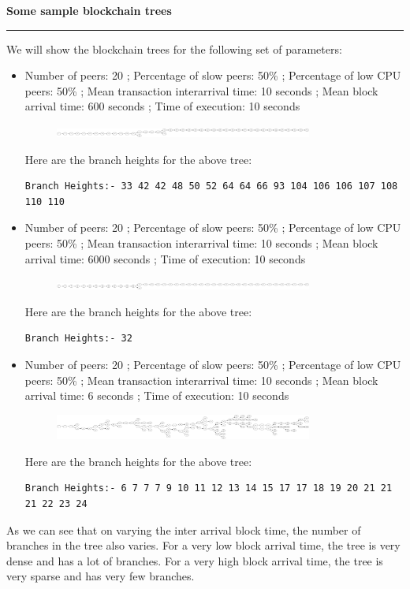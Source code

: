 \documentclass[a4paper,12pt]{article}
\newenvironment{solution}[2][]{%
\begin{mdframed}[linecolor=blue!70!black, linewidth=2pt, roundcorner=10pt, backgroundcolor=yellow!10!white, skipabove=12pt, skipbelow=12pt]%
	\textbf{\large #2}
	\par\noindent\rule{\textwidth}{0.4pt}
}{
\end{mdframed}
}
\begin{document}
\begin{solution}{Some sample blockchain trees}
	We will show the blockchain trees for the following set of parameters:

	\begin{itemize}
		\item Number of peers: 20 ; Percentage of slow peers: 50\% ; Percentage of low CPU peers: 50\% ; Mean transaction interarrival time: 10 seconds ; Mean block arrival time: 600 seconds ; Time of execution: 10 seconds
		\begin{figure}[H]
			\centering
			\includegraphics[width=0.8\textwidth]{../images/b1.png}
		\end{figure}
		Here are the branch heights for the above tree:
		\begin{verbatim}
Branch Heights:- 33 42 42 48 50 52 64 64 66 93 104 106 106 107 108 110 110
		\end{verbatim}
		\item Number of peers: 20 ; Percentage of slow peers: 50\% ; Percentage of low CPU peers: 50\% ; Mean transaction interarrival time: 10 seconds ; Mean block arrival time: 6000 seconds ; Time of execution: 10 seconds
		\begin{figure}[H]
			\centering
			\includegraphics[width=0.8\textwidth]{../images/b2.png}
		\end{figure}
		Here are the branch heights for the above tree:
		\begin{verbatim}
Branch Heights:- 32
		\end{verbatim}
		\item Number of peers: 20 ; Percentage of slow peers: 50\% ; Percentage of low CPU peers: 50\% ; Mean transaction interarrival time: 10 seconds ; Mean block arrival time: 6 seconds ; Time of execution: 10 seconds
		\begin{figure}[H]
			\centering
			\includegraphics[width=0.8\textwidth]{../images/b3.png}
		\end{figure}

		Here are the branch heights for the above tree:
		\begin{verbatim}
Branch Heights:- 6 7 7 7 9 10 11 12 13 14 15 17 17 18 19 20 21 21 21 22 23 24
		\end{verbatim}
	\end{itemize}

	As we can see  that on varying the inter arrival block time, the number of branches in the tree also varies. For a very low block arrival time, the tree is very dense and has a lot of branches. For a very high block arrival time, the tree is very sparse and has very few branches.
	
\end{solution}
\end{document}
